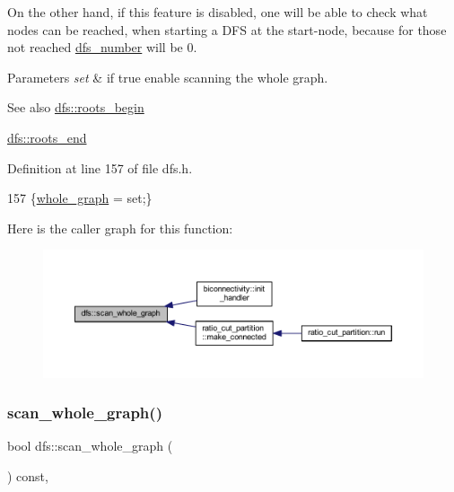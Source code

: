 On the other hand, if this feature is disabled, one will be able to check what nodes can be reached, when starting a D\+FS at the start-\/node, because for those not reached \mbox{\hyperlink{classdfs_a99727f2274d6af63daae4f0518f3adbe}{dfs\+\_\+number}} will be 0.


\begin{DoxyParams}{Parameters}
{\em set} & if true enable scanning the whole graph. \\
\hline
\end{DoxyParams}
\begin{DoxySeeAlso}{See also}
\mbox{\hyperlink{classdfs_af56fa2b736f0b924dba1257e18ba4b61}{dfs\+::roots\+\_\+begin}} 

\mbox{\hyperlink{classdfs_ae1a61d8c2d8d99059cab410f766ec73f}{dfs\+::roots\+\_\+end}} 
\end{DoxySeeAlso}


Definition at line 157 of file dfs.\+h.


\begin{DoxyCode}
157 \{\mbox{\hyperlink{classdfs_ab8342c80ab208ef0e0d781f0769d0d95}{whole\_graph}} = \textcolor{keyword}{set};\}
\end{DoxyCode}
Here is the caller graph for this function\+:
\nopagebreak
\begin{figure}[H]
\begin{center}
\leavevmode
\includegraphics[width=350pt]{classdfs_aa7c864a6f3a120720138b187b3ed95b5_icgraph}
\end{center}
\end{figure}
\mbox{\label{classdfs_a025ed2d6101a7b9f72578a52b484ef50}} 
\subsubsection{\texorpdfstring{scan\+\_\+whole\+\_\+graph()}{scan\_whole\_graph()}\hspace{0.1cm}{\footnotesize\ttfamily [2/2]}}
{\footnotesize\ttfamily bool dfs\+::scan\+\_\+whole\+\_\+graph (\begin{DoxyParamCaption}{ }\end{DoxyParamCaption}) const\hspace{0.3cm}{\ttfamily [inline]}, {\ttfamily [inherited]}}




